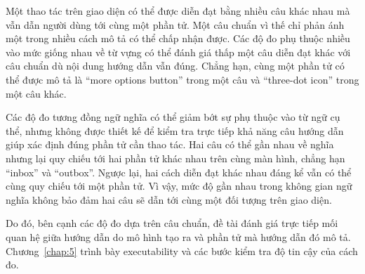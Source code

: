 Một thao tác trên giao diện có thể được diễn đạt bằng nhiều câu khác nhau mà vẫn dẫn người dùng tới cùng một phần tử. Một câu chuẩn vì thế chỉ phản ánh một trong nhiều cách mô tả có thể chấp nhận được. Các độ đo phụ thuộc nhiều vào mức giống nhau về từ vựng có thể đánh giá thấp một câu diễn đạt khác với câu chuẩn dù nội dung hướng dẫn vẫn đúng. Chẳng hạn, cùng một phần tử có thể được mô tả là “more options button” trong một câu và “three-dot icon” trong một câu khác.

Các độ đo tương đồng ngữ nghĩa có thể giảm bớt sự phụ thuộc vào từ ngữ cụ thể, nhưng không được thiết kế để kiểm tra trực tiếp khả năng câu hướng dẫn giúp xác định đúng phần tử cần thao tác. Hai câu có thể gần nhau về nghĩa nhưng lại quy chiếu tới hai phần tử khác nhau trên cùng màn hình, chẳng hạn “inbox” và “outbox”. Ngược lại, hai cách diễn đạt khác nhau đáng kể vẫn có thể cùng quy chiếu tới một phần tử. Vì vậy, mức độ gần nhau trong không gian ngữ nghĩa không bảo đảm hai câu sẽ dẫn tới cùng một đối tượng trên giao diện.

Do đó, bên cạnh các độ đo dựa trên câu chuẩn, đề tài đánh giá trực tiếp mối quan hệ giữa hướng dẫn do mô hình tạo ra và phần tử mà hướng dẫn đó mô tả. Chương~\ref{chap:5} trình bày executability và các bước kiểm tra độ tin cậy của cách đo.
